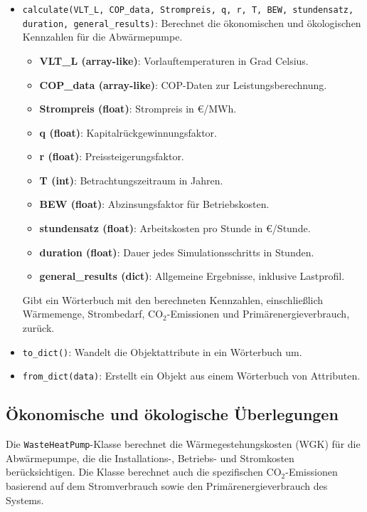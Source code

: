 \begin{itemize}
    \item \texttt{calculate(VLT\_L, COP\_data, Strompreis, q, r, T, BEW, stundensatz, duration, general\_results)}: 
    Berechnet die ökonomischen und ökologischen Kennzahlen für die Abwärmepumpe.
    \begin{itemize}
        \item \textbf{VLT\_L (array-like)}: Vorlauftemperaturen in Grad Celsius.
        \item \textbf{COP\_data (array-like)}: COP-Daten zur Leistungsberechnung.
        \item \textbf{Strompreis (float)}: Strompreis in €/MWh.
        \item \textbf{q (float)}: Kapitalrückgewinnungsfaktor.
        \item \textbf{r (float)}: Preissteigerungsfaktor.
        \item \textbf{T (int)}: Betrachtungszeitraum in Jahren.
        \item \textbf{BEW (float)}: Abzinsungsfaktor für Betriebskosten.
        \item \textbf{stundensatz (float)}: Arbeitskosten pro Stunde in €/Stunde.
        \item \textbf{duration (float)}: Dauer jedes Simulationsschritts in Stunden.
        \item \textbf{general\_results (dict)}: Allgemeine Ergebnisse, inklusive Lastprofil.
    \end{itemize}
    Gibt ein Wörterbuch mit den berechneten Kennzahlen, einschließlich Wärmemenge, Strombedarf, CO$_2$-Emissionen und Primärenergieverbrauch, zurück.

    \item \texttt{to\_dict()}: Wandelt die Objektattribute in ein Wörterbuch um.
    
    \item \texttt{from\_dict(data)}: Erstellt ein Objekt aus einem Wörterbuch von Attributen.
\end{itemize}

\subsection{Ökonomische und ökologische Überlegungen}
Die \texttt{WasteHeatPump}-Klasse berechnet die Wärmegestehungskosten (WGK) für die Abwärmepumpe, die die Installations-, Betriebs- und Stromkosten berücksichtigen. Die Klasse berechnet auch die spezifischen CO$_2$-Emissionen basierend auf dem Stromverbrauch sowie den Primärenergieverbrauch des Systems.

